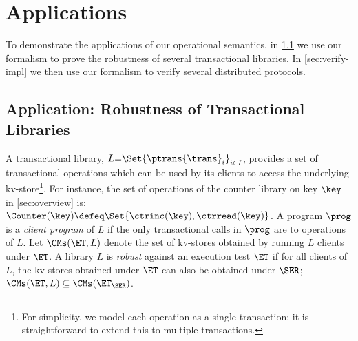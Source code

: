 \section{Applications}
\label{sec:applications}
\label{sec:program-analysis}

To demonstrate the applications of our operational semantics, 
in \cref{sec:robustness} we use our formalism to prove the robustness of several transactional libraries.
In \cref{sec:verify-impl} we then use our formalism to verify several distributed protocols.

\subsection{Application: Robustness of Transactional Libraries}
\label{sec:robustness}
A transactional library, $L {=} \Set{\ptrans{\trans}_{i}}_{i \in I}$,
provides a set of transactional operations which can be used by its clients to access the underlying
kv-store\footnote{For simplicity, we model each operation as a single transaction; it is straightforward to extend this to multiple transactions.}. 
For instance, the set of operations of the counter library on key $\key$ in \cref{sec:overview} is: $\Counter(\key) \defeq \Set{\ctrinc(\key), \ctrread(\key)}$.
A program $\prog$ is a \emph{client program} of $L$ if the only transactional calls in $\prog$ are to operations of $L$.  
Let $\CMs(\ET, L)$ denote the set of kv-stores obtained by running $L$ clients under $\ET$.
A library $L$ is \emph{robust} against an execution test
$\ET$ if for all clients of $L$, the kv-stores obtained under $\ET$ can also be obtained under $\SER$; 
\ie $\CMs(\ET, L) \subseteq \CMs(\ET_{\SER})$.



